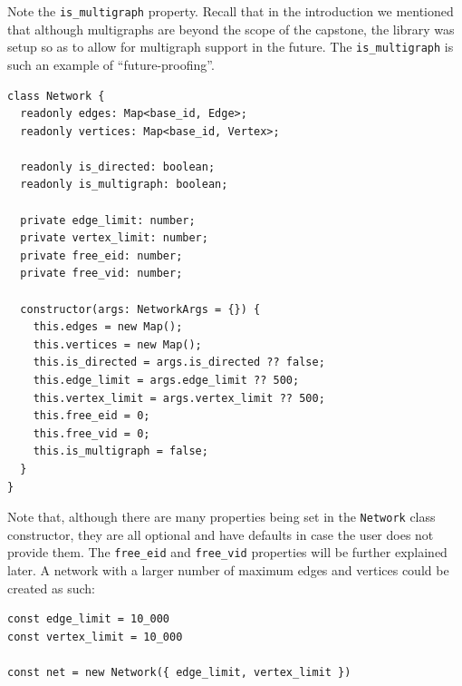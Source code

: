Note the \texttt{is_multigraph} property.
Recall that in the introduction we mentioned that although multigraphs
are beyond the scope of the capstone, the library was setup so
as to allow for multigraph support in the future.
The \texttt{is_multigraph} is such an example of ``future-proofing''.

\begin{verbatim}
class Network {
  readonly edges: Map<base_id, Edge>;
  readonly vertices: Map<base_id, Vertex>;

  readonly is_directed: boolean;
  readonly is_multigraph: boolean;

  private edge_limit: number;
  private vertex_limit: number;
  private free_eid: number;
  private free_vid: number;

  constructor(args: NetworkArgs = {}) {
    this.edges = new Map();
    this.vertices = new Map();
    this.is_directed = args.is_directed ?? false;
    this.edge_limit = args.edge_limit ?? 500;
    this.vertex_limit = args.vertex_limit ?? 500;
    this.free_eid = 0;
    this.free_vid = 0;
    this.is_multigraph = false;
  }
}
\end{verbatim}

Note that, although there are many properties being set 
in the \texttt{Network} class constructor,
they are all optional and have defaults in case the user does not provide them.
The \texttt{free_eid} and \texttt{free_vid} properties will be further explained later.
A network with a larger number of maximum edges and vertices could be created as such:

\begin{verbatim}
const edge_limit = 10_000
const vertex_limit = 10_000

const net = new Network({ edge_limit, vertex_limit })
\end{verbatim}